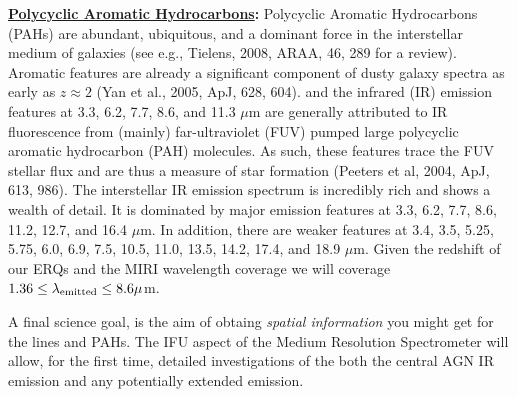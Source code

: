 \smallskip
\smallskip
\noindent
{\bf \underline{Polycyclic Aromatic Hydrocarbons}:}
Polycyclic Aromatic Hydrocarbons (PAHs) are abundant, ubiquitous, and
a dominant force in the interstellar medium of galaxies (see e.g.,
Tielens, 2008, ARAA, 46, 289 for a review).  Aromatic features are
already a significant component of dusty galaxy spectra as early as
$z\approx2$ (Yan et al., 2005, ApJ, 628, 604).  and the infrared (IR)
emission features at 3.3, 6.2, 7.7, 8.6, and 11.3 $\mu$m are generally
attributed to IR fluorescence from (mainly) far-ultraviolet (FUV)
pumped large polycyclic aromatic hydrocarbon (PAH) molecules. As such,
these features trace the FUV stellar flux and are thus a measure of
star formation (Peeters et al, 2004, ApJ, 613, 986).
The interstellar IR emission spectrum is incredibly rich and shows a
wealth of detail.  It is dominated by major emission features at 3.3,
6.2, 7.7, 8.6, 11.2, 12.7, and 16.4 $\mu$m.  In addition, there are
weaker features at 3.4, 3.5, 5.25, 5.75, 6.0, 6.9, 7.5, 10.5, 11.0,
13.5, 14.2, 17.4, and 18.9 $\mu$m.  Given the redshift of our ERQs and
the MIRI wavelength coverage we will coverage $1.36 \leq \lambda_{\rm
emitted} \leq 8.6 \mu$m.


\smallskip
\smallskip
\noindent
A final science goal, is the aim of obtaing {\it spatial information} you might get for the lines and PAHs. 
The IFU aspect of the Medium Resolution Spectrometer will allow, for the first time, detailed investigations of the both the central AGN IR emission and any potentially extended emission.

